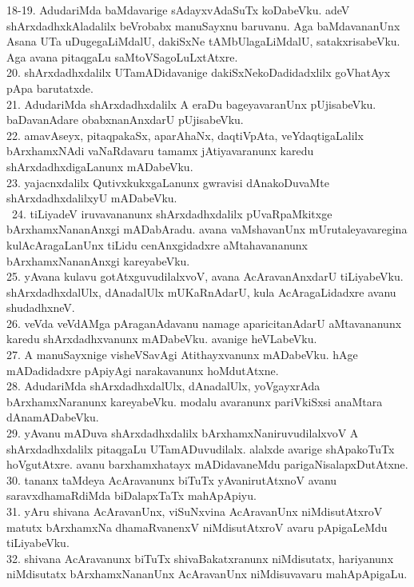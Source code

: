 \documentclass{article}
\begin{document}
18-19. AdudariMda baMdavarige sAdayxvAdaSuTx koDabeVku. adeV shArxdadhxkAladalilx beVrobabx manuSayxnu baruvanu. Aga baMdavananUnx Asana UTa uDugegaLiMdalU, dakiSxNe tAMbUlagaLiMdalU, satakxrisabeVku. Aga avana pitaqgaLu saMtoVSagoLuLxtAtxre.\\
20. shArxdadhxdalilx UTamADidavanige dakiSxNekoDadidadxlilx goVhatAyx pApa barutatxde.\\
21. AdudariMda shArxdadhxdalilx A eraDu bageyavaranUnx pUjisabeVku. baDavanAdare obabxnanAnxdarU pUjisabeVku.\\
22. amavAseyx, pitaqpakaSx, aparAhaNx, daqtiVpAta, veYdaqtigaLalilx bArxhamxNAdi vaNaRdavaru tamamx jAtiyavaranunx karedu shArxdadhxdigaLanunx mADabeVku.\\
23. yajacnxdalilx QutivxkukxgaLanunx gwravisi dAnakoDuvaMte shArxdadhxdalilxyU mADabeVku.\\\
24. tiLiyadeV iruvavananunx shArxdadhxdalilx pUvaRpaMkitxge bArxhamxNananAnxgi mADabAradu. avana vaMshavanUnx mUrutaleyavaregina kulAcAragaLanUnx tiLidu cenAnxgidadxre aMtahavananunx bArxhamxNananAnxgi kareyabeVku.\\
25. yAvana kulavu gotAtxguvudilalxvoV, avana AcAravanAnxdarU tiLiyabeVku. shArxdadhxdalUlx, dAnadalUlx mUKaRnAdarU, kula AcAragaLidadxre avanu shudadhxneV.\\
26. veVda veVdAMga pAraganAdavanu namage aparicitanAdarU aMtavananunx karedu shArxdadhxvanunx mADabeVku. avanige heVLabeVku.\\
27. A manuSayxnige visheVSavAgi Atithayxvanunx mADabeVku. hAge mADadidadxre pApiyAgi narakavanunx hoMdutAtxne.\\
28. AdudariMda shArxdadhxdalUlx, dAnadalUlx, yoVgayxrAda bArxhamxNaranunx kareyabeVku. modalu avaranunx pariVkiSxsi anaMtara dAnamADabeVku.\\
29. yAvanu mADuva shArxdadhxdalilx bArxhamxNaniruvudilalxvoV A shArxdadhxdalilx pitaqgaLu UTamADuvudilalx. alalxde avarige shApakoTuTx hoVgutAtxre. avanu barxhamxhatayx mADidavaneMdu parigaNisalapxDutAtxne.\\
30. tananx taMdeya AcAravanunx biTuTx yAvanirutAtxnoV avanu saravxdhamaRdiMda biDalapxTaTx mahApApiyu.\\
31. yAru shivana AcAravanUnx, viSuNxvina AcAravanUnx niMdisutAtxroV matutx bArxhamxNa dhamaRvanenxV niMdisutAtxroV avaru pApigaLeMdu tiLiyabeVku.\\
32. shivana AcAravanunx biTuTx shivaBakatxranunx niMdisutatx, hariyanunx niMdisutatx bArxhamxNananUnx AcAravanUnx niMdisuvavaru mahApApigaLu.\\
\end{document}
